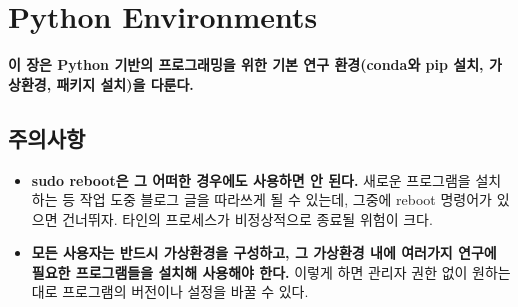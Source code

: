 
\graphicspath{{./chap3/images/}}  
\chapter{Python Environments}

\textbf{이 장은 Python 기반의 프로그래밍을 위한 기본 연구 환경(conda와 pip 설치, 가상환경, 패키지 설치)을 다룬다.}
\section{주의사항}
\begin{itemize}
 \item \textbf{sudo reboot은 그 어떠한 경우에도 사용하면 안 된다.} 새로운 프로그램을 설치하는 등 작업 도중 블로그 글을 따라쓰게 될 수 있는데, 그중에 reboot 명령어가 있으면 건너뛰자. 타인의 프로세스가 비정상적으로 종료될 위험이 크다.
 \item \textbf{모든 사용자는 반드시 가상환경을 구성하고, 그 가상환경 내에 여러가지 연구에 필요한 프로그램들을 설치해 사용해야 한다.} 이렇게 하면 관리자 권한 없이 원하는 대로 프로그램의 버전이나 설정을 바꿀 수 있다.
\end{itemize}

